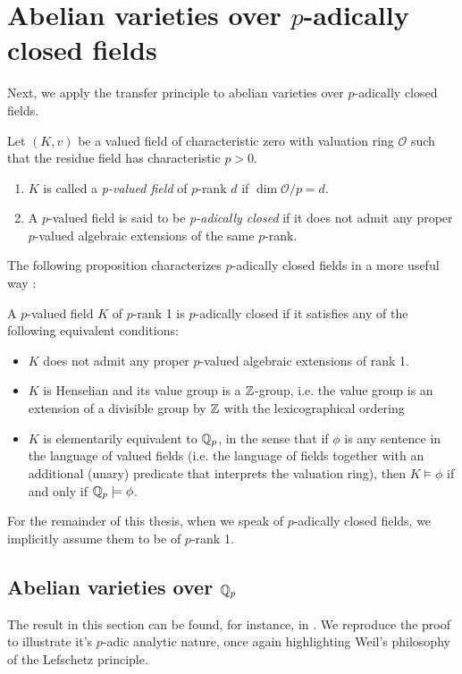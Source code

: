 

\chapter{Abelian varieties over $p$-adically closed fields}
Next, we apply the transfer principle to abelian varieties over $p$-adically closed fields.

\begin{definition}
Let $(K,v)$ be a valued field of characteristic zero with valuation ring $\mathcal{O}$ such that the residue field has characteristic $p>0$. 
\begin{enumerate}
\item $K$ is called a \emph{p-valued field} of $p$-rank $d$ if $\dim \mathcal{O}/p=d$.
\item A $p$-valued field is said to be \emph{p-adically closed} if it does not admit any proper $p$-valued algebraic extensions of the same $p$-rank.
\end{enumerate}
\end{definition}

The following proposition characterizes $p$-adically closed fields in a more useful way \cite{formallyp-adic}:

\begin{proposition}
A $p$-valued field $K$ of $p$-rank 1 is $p$-adically closed if it satisfies any of the following equivalent conditions:
\begin{itemize}
	\item $K$ does not admit any proper $p$-valued algebraic extensions of rank 1.
	\item $K$ is Henselian and its value group is a $\mathbb{Z}$-group, i.e. the value group is an extension of a divisible group by $\mathbb{Z}$ with the lexicographical ordering
	\item $K$ is elementarily equivalent to $\mathbb{Q}_p$, in the sense that if $\phi$ is any sentence in the language of valued fields (i.e. the language of fields together with an additional (unary) predicate that interprets the valuation ring), then $K\models \phi$ if and only if $\mathbb{Q}_p\models \phi$.
\end{itemize}
\end{proposition}

For the remainder of this thesis, when we speak of $p$-adically closed fields, we implicitly assume them to be of $p$-rank 1.

\section{Abelian varieties over $\mathbb{Q}_p$}
The result in this section can be found, for instance, in \cite{clark2019there}. We reproduce the proof to illustrate it's $p$-adic analytic nature, once again highlighting Weil's philosophy of the Lefschetz principle.

